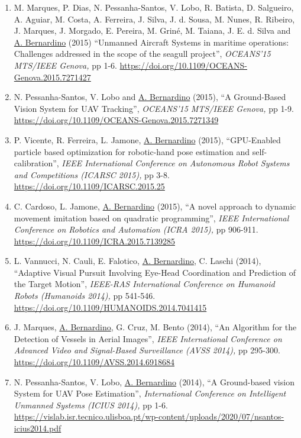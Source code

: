 \documentclass[
]{article}
\begin{document}
\begin{enumerate}
  \url{https://doi.org/10.1007/978-3-319-20904-3_46}~
\item
  M. Marques, P. Dias, N. Pessanha-Santos, V. Lobo, R. Batista, D.
  Salgueiro, A. Aguiar, M. Costa, A. Ferreira, J. Silva, J. d. Sousa, M.
  Nunes, R. Ribeiro, J. Marques, J. Morgado, E. Pereira, M. Griné, M.
  Taiana, J. E. d. Silva and \ul{A. Bernardino} (2015) ``Unmanned
  Aircraft Systems in maritime operations: Challenges addressed in the
  scope of the seagull project'', \emph{OCEANS'15 MTS/IEEE Genova,} pp
  1-6. \url{https://doi.org/10.1109/OCEANS-Genova.2015.7271427}~
\item
  N. Pessanha-Santos, V. Lobo and \ul{A. Bernardino} (2015), ``A
  Ground-Based Vision System for UAV Tracking'', \emph{OCEANS'15
  MTS/IEEE Genova,} pp 1-9.
  \url{https://doi.org/10.1109/OCEANS-Genova.2015.7271349}~
\item
  P. Vicente, R. Ferreira, L. Jamone, \ul{A. Bernardino} (2015),
  ``GPU-Enabled particle based optimization for robotic-hand pose
  estimation and self-calibration'', \emph{IEEE International Conference
  on Autonomous Robot Systems and Competitions (ICARSC 2015),} pp 3-8.
  \url{https://doi.org/10.1109/ICARSC.2015.25}~
\item
  C. Cardoso, L. Jamone, \ul{A. Bernardino} (2015), ``A novel approach
  to dynamic movement imitation based on quadratic programming'',
  \emph{IEEE International Conference on Robotics and Automation (ICRA
  2015),} pp 906-911. \url{https://doi.org/10.1109/ICRA.2015.7139285}~
\item
  L. Vannucci, N. Cauli, E. Falotico, \ul{A. Bernardino}, C. Laschi
  (2014), ``Adaptive Visual Pursuit Involving Eye-Head Coordination and
  Prediction of the Target Motion'', \emph{IEEE-RAS International
  Conference on Humanoid Robots (Humanoids 2014),} pp 541-546.
  \url{https://doi.org/10.1109/HUMANOIDS.2014.7041415}~~~
\item
  J. Marques, \ul{A. Bernardino}, G. Cruz, M. Bento (2014), ``An
  Algorithm for the Detection of Vessels in Aerial Images'', \emph{IEEE
  International Conference on Advanced Video and Signal-Based
  Surveillance (AVSS 2014),} pp 295-300.
  \url{https://doi.org/10.1109/AVSS.2014.6918684}~
\item
  N. Pessanha-Santos, V. Lobo, \ul{A. Bernardino} (2014), ``A
  Ground-based vision System for UAV Pose Estimation'',
  \emph{International Conference on Intelligent Unmanned Systems (ICIUS
  2014),} pp 1-6.
  \url{https://vislab.isr.tecnico.ulisboa.pt/wp-content/uploads/2020/07/nsantos-icius2014.pdf}~

\end{enumerate}
\end{document}
